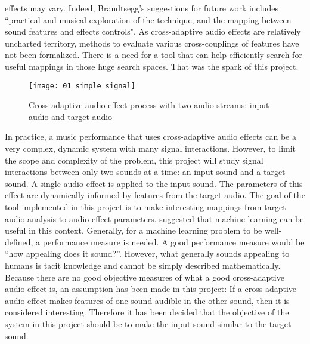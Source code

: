 effects may vary. Indeed, Brandtsegg's suggestions for future work includes ``practical and musical exploration of the technique, and the mapping between sound features and effects controls". As cross-adaptive audio effects are relatively uncharted territory, methods to evaluate various cross-couplings of features have not been formalized. There is a need for a tool that can help efficiently search for useful mappings in those huge search spaces. That was the spark of this project.

\begin{figure}[h]
    \centering
    \texttt{[image: 01\_simple\_signal]}
    \caption{Cross-adaptive audio effect process with two audio streams: input audio and target audio}
    \label{fig:simple_signal}
\end{figure}

In practice, a music performance that uses cross-adaptive audio effects can be a very complex, dynamic system with many signal interactions. However, to limit the scope and complexity of the problem, this project will study signal interactions between only two sounds at a time: an input sound and a target sound. A single audio effect is applied to the input sound. The parameters of this effect are dynamically informed by features from the target audio. The goal of the tool implemented in this project is to make interesting mappings from target audio analysis to audio effect parameters. \cite{brandtsegg2015} suggested that machine learning can be useful in this context. Generally, for a machine learning problem to be well-defined, a performance measure is needed. A good performance measure would be “how appealing does it sound?”. However, what generally sounds appealing to humans is tacit knowledge and cannot be simply described mathematically. Because there are no good objective measures of what a good cross-adaptive audio effect is, an assumption has been made in this project: If a cross-adaptive audio effect makes features of one sound audible in the other sound, then it is considered interesting. Therefore it has been decided that the objective of the system in this project should be to make the input sound similar to the target sound.

